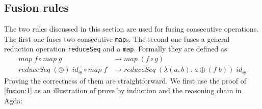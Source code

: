 \documentclass{l4proj}
\begin{document}
\subsection{Fusion rules}
\label{alg:fusion}
The two rules discussed in this section are used for fusing consecutive operations. The first one fuses two consecutive \texttt{map}s. The second one fuses a general reduction operation \texttt{reduceSeq} and a \texttt{map}. Formally they are defined as:
\begin{align}
    \label{fusion:1}
    map\; f \circ map\; g &\to map\; (f \circ g) \\
    \label{fusion:2}
    reduceSeq\; (\oplus)\; id_\oplus \circ map\; f &\to reduceSeq\; (\lambda (a, b).\; a \oplus (f\; b))\; id_\oplus
\end{align}
Proving the correctness of them are straightforward. We first use the proof of \ref{fusion:1} as an illustration of prove by induction and the reasoning chain in Agda:
\end{document}
